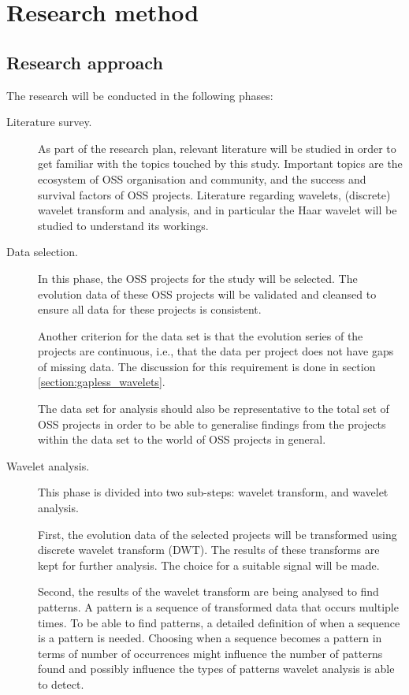 \chapter{Research method}
\label{method}

\section{Research approach}
\label{section:approach}
The research will be conducted in the following phases:
\begin{description}
	\item[Literature survey.] As part of the research plan, relevant literature
	will be studied in order to get familiar with the topics touched by this
	study. Important topics are the ecosystem of OSS organisation and community,
	and the success and survival factors of OSS projects. Literature regarding
	wavelets, (discrete) wavelet transform and analysis, and in particular the
	Haar wavelet will be studied to understand its workings.

	\item[Data selection.] In this phase, the OSS projects for the study will be
	selected. The evolution data of these OSS projects will be validated and
	cleansed to ensure all data for these projects is consistent.
	
	Another criterion for the data set is that the evolution series of the projects
	are continuous, i.e., that the data per project does not have gaps of missing
	data. The discussion for this requirement is done in section
	\ref{section:gapless_wavelets}.

	The data set for analysis should also be representative to the total set of
	OSS projects in order to be able to generalise findings from the
	projects within the data set to the world of OSS projects in general.
	
	\item[Wavelet analysis.] This phase is divided into two sub-steps: wavelet
	transform, and wavelet analysis.
	
	First, the evolution data of the selected projects will be transformed using
	discrete wavelet transform (DWT). The results of these transforms are kept for
	further analysis. The choice for a suitable signal will be made.
	
	Second, the results of the wavelet transform are being analysed to find
	patterns. A pattern is a sequence of transformed data that occurs multiple
	times. To be able to find patterns, a detailed definition of when a sequence
	is a pattern is needed. Choosing when a sequence becomes a pattern in terms of
	number of occurrences might influence the number of patterns found and
	possibly influence the types of patterns wavelet analysis is able to detect.
	

\end{description}
